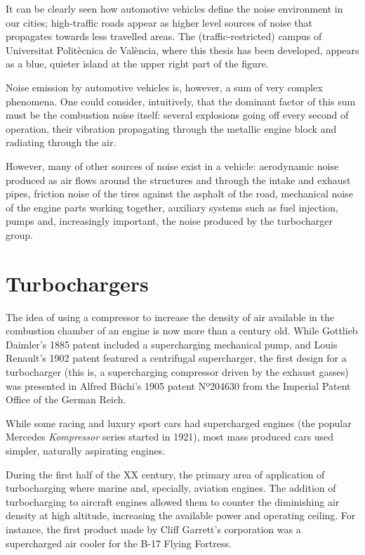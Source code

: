 It can be clearly seen how automotive vehicles define the noise environment in our cities; high-traffic roads appear as higher level sources of noise that propagates towards less travelled areas. The (traffic-restricted) campus of Universitat Politècnica de València, where this thesis has been developed, appears as a blue, quieter island at the upper right part of the figure.

Noise emission by automotive vehicles is, however, a sum of very complex phenomena. One could consider, intuitively, that the dominant factor of this sum must be the combustion noise itself: several explosions going off every second of operation, their vibration propagating through the metallic engine block and radiating through the air.

However, many of other sources of noise exist in a vehicle: aerodynamic noise produced as air flows around the structures and through the intake and exhaust pipes, friction noise of the tires against the asphalt of the road, mechanical noise of the engine parts working together, auxiliary systems such as fuel injection, pumps and, increasingly important, the noise produced by the turbocharger group.

\section{Turbochargers}

The idea of using a compressor to increase the density of air available in the combustion chamber of an engine is now more than a century old. While Gottlieb Daimler's 1885 patent included a supercharging mechanical pump, and Louis Renault's 1902 patent featured a centrifugal supercharger, the first design for a turbocharger (this is, a supercharging compressor driven by the exhaust gasses) was presented in Alfred Büchi's 1905 patent Nº204630 from the Imperial Patent Office of the German Reich.

While some racing and luxury sport cars had supercharged engines (the popular Mercedes \emph{Kompressor} series started in 1921), most mass produced cars used simpler, naturally aspirating engines.

During the first half of the XX century, the primary area of application of turbocharging where marine and, specially, aviation engines. The addition of turbocharging to aircraft engines allowed them to counter the diminishing air density at high altitude, increasing the available power and operating ceiling. For instance, the first product made by Cliff Garrett's corporation was a supercharged air cooler for the B-17 Flying Fortress.

